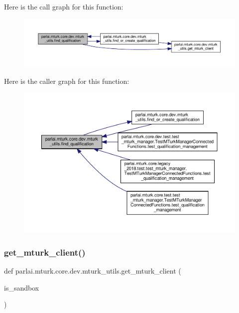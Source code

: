 Here is the call graph for this function\+:
\nopagebreak
\begin{figure}[H]
\begin{center}
\leavevmode
\includegraphics[width=350pt]{namespaceparlai_1_1mturk_1_1core_1_1dev_1_1mturk__utils_acd636315cbbf11cc5d9d641173e51586_cgraph}
\end{center}
\end{figure}
Here is the caller graph for this function\+:
\nopagebreak
\begin{figure}[H]
\begin{center}
\leavevmode
\includegraphics[width=350pt]{namespaceparlai_1_1mturk_1_1core_1_1dev_1_1mturk__utils_acd636315cbbf11cc5d9d641173e51586_icgraph}
\end{center}
\end{figure}
\mbox{\label{namespaceparlai_1_1mturk_1_1core_1_1dev_1_1mturk__utils_ad9e4ecfca00663796f26ca16a2778f29}} 
\subsubsection{\texorpdfstring{get\+\_\+mturk\+\_\+client()}{get\_mturk\_client()}}
{\footnotesize\ttfamily def parlai.\+mturk.\+core.\+dev.\+mturk\+\_\+utils.\+get\+\_\+mturk\+\_\+client (\begin{DoxyParamCaption}\item[{}]{is\+\_\+sandbox }\end{DoxyParamCaption})}

